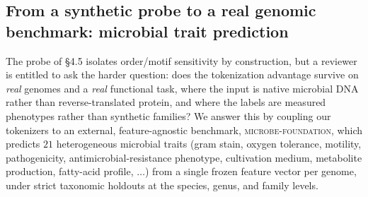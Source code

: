 %
%

\subsection{From a synthetic probe to a real genomic benchmark: microbial trait prediction}
\label{sec:microbe}

The probe of \S4.5 isolates order/motif sensitivity by construction, but a
reviewer is entitled to ask the harder question: does the tokenization
advantage survive on \emph{real} genomes and a \emph{real} functional task,
where the input is native microbial DNA rather than reverse-translated
protein, and where the labels are measured phenotypes rather than synthetic
families? We answer this by coupling our tokenizers to an external,
feature-agnostic benchmark, \textsc{microbe-foundation}, which predicts $21$
heterogeneous microbial traits (gram stain, oxygen tolerance, motility,
pathogenicity, antimicrobial-resistance phenotype, cultivation medium,
metabolite production, fatty-acid profile, $\ldots$) from a single frozen
feature vector per genome, under strict taxonomic holdouts at the species,
genus, and family levels.


